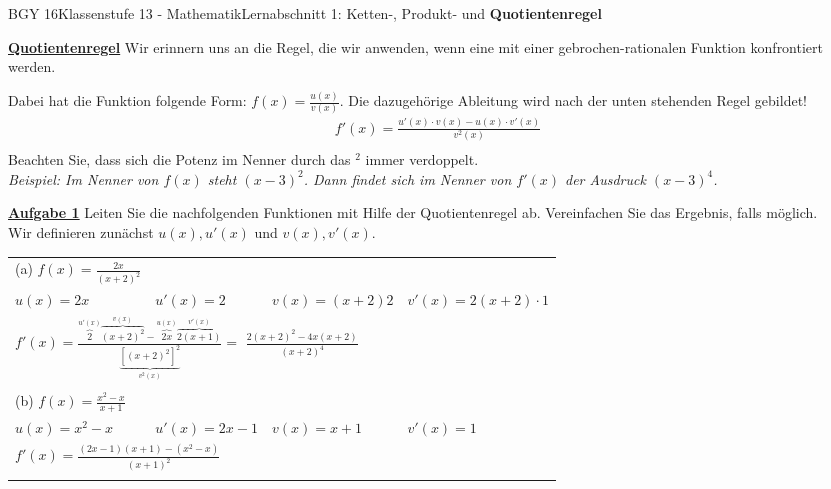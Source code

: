 \documentclass[oneside,openany,headings=optiontotoc,11pt,numbers=noenddot]{scrreprt}
\begin{document}
	\begin{worksheet}{BGY 16}{Klassenstufe 13 - Mathematik}{Lernabschnitt 1: Ketten-, Produkt- und \textbf{Quotientenregel}}
				
		\noindent
		\sffamily
		\begin{framed}
			\noindent
			\textbf{\underline{Quotientenregel}} Wir erinnern uns an die Regel, die wir anwenden, wenn eine mit einer gebrochen-rationalen Funktion konfrontiert werden.\\
			\par\noindent
			Dabei hat die Funktion folgende Form: \(f(x) = \frac{u(x)}{v(x)}\). Die dazugehörige Ableitung wird nach der unten stehenden Regel gebildet!
			\begin{align*}				
				f'(x) = \frac{u'(x)\cdot{}v(x) - u(x)\cdot{}v'(x)}{v^2(x)}\\
			\end{align*}
			Beachten Sie, dass sich die Potenz im Nenner durch das \underline{\colorbox{blue!10}{\(^2\)}} immer verdoppelt.\\
			\textit{Beispiel: Im Nenner von \(f(x)\) steht \((x-3)^2\). Dann findet sich im Nenner von \(f'(x)\) der Ausdruck \((x-3)^4\).}
		\end{framed}
		\begin{framed}
			\noindent
			\textbf{\underline{Aufgabe 1}} Leiten Sie die nachfolgenden Funktionen mit Hilfe der Quotientenregel ab. Vereinfachen Sie das Ergebnis, falls möglich.\\
			Wir definieren zunächst \(u(x), u'(x)\) und \(v(x), v'(x)\).
			\par
			\begin{tabularx}{\textwidth}{llll}
				(a) \(f(x) = \frac{2x}{(x+2)^2}\)\\
				\(u(x) = 2x\) & \(u'(x) = 2\) & \(v(x) = (x+2)2\) & \(v'(x) = 2(x+2)\cdot{}1\)\\
				\multicolumn{4}{l}{\(f'(x) = \frac{\overbrace{2}^{u'(x)}\overbrace{(x+2)^2}^{v(x)} - \overbrace{2x}^{u(x)}\overbrace{2(x+1)}^{v'(x)}}{\underbrace{[(x+2)^2]^2}_{v^2(x)}} =\) \colorbox{green!10}{\(\frac{2(x+2)^2-4x(x+2)}{(x+2)^4}\)}}\\
				\\
				(b) \(f(x) = \frac{x^2-x}{x+1}\)\\
				\(u(x) = x^2-x\) & \(u'(x) = 2x-1\) & \(v(x) = x+1\) & \(v'(x) = 1\)\\
				\multicolumn{4}{l}{\colorbox{green!10}{\(f'(x) = \frac{(2x-1)(x+1)-(x^2-x)}{(x+1)^2}\)}}\\
				\\

\end{tabularx}
\end{framed}
\end{worksheet}
\end{document}
